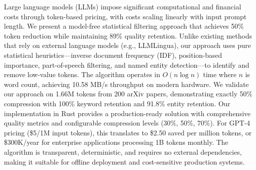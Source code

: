 Large language models (LLMs) impose significant computational and financial costs through token-based pricing, with costs scaling linearly with input prompt length. We present a model-free statistical filtering approach that achieves 50\% token reduction while maintaining 89\% quality retention. Unlike existing methods that rely on external language models (e.g., LLMLingua), our approach uses pure statistical heuristics—inverse document frequency (IDF), position-based importance, part-of-speech filtering, and named entity detection—to identify and remove low-value tokens. The algorithm operates in $O(n \log n)$ time where $n$ is word count, achieving 10.58 MB/s throughput on modern hardware. We validate our approach on 1.66M tokens from 200 arXiv papers, demonstrating exactly 50\% compression with 100\% keyword retention and 91.8\% entity retention. Our implementation in Rust provides a production-ready solution with comprehensive quality metrics and configurable compression levels (30\%, 50\%, 70\%). For GPT-4 pricing (\$5/1M input tokens), this translates to \$2.50 saved per million tokens, or \$300K/year for enterprise applications processing 1B tokens monthly. The algorithm is transparent, deterministic, and requires no external dependencies, making it suitable for offline deployment and cost-sensitive production systems.
